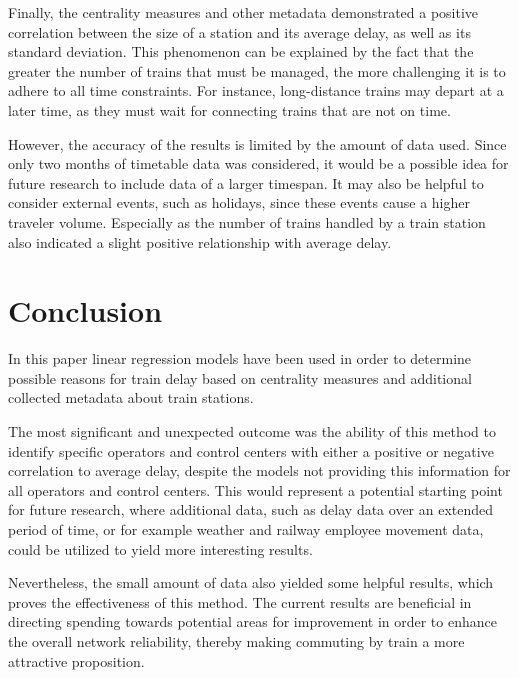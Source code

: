 \documentclass[12pt,a4paper]{article}
\begin{document}
Finally, the centrality measures and other metadata demonstrated a positive correlation between the size of a station and its average delay, as well as its standard deviation. 
This phenomenon can be explained by the fact that the greater the number of trains that must be managed, the more challenging it is to adhere to all time constraints. 
For instance, long-distance trains may depart at a later time, as they must wait for connecting trains that are not on time.

However, the accuracy of the results is limited by the amount of data used. Since only two months of timetable data was considered, it would be a possible idea for future research to include data of a larger timespan. 
It may also be helpful to consider external events, such as holidays, since these events cause a higher traveler volume. Especially as the number of trains handled by a train station also indicated a slight positive relationship with average delay.

\maketitle
\section{\label{sec:Conclusion}Conclusion}

In this paper linear regression models have been used in order to determine possible reasons for train delay based on centrality measures and additional collected metadata about train stations. 

The most significant and unexpected outcome was the ability of this method to identify specific operators and control centers with either a positive or negative correlation to average delay, despite the models not providing this information for all operators and control centers. 
This would represent a potential starting point for future research, where additional data, such as delay data over an extended period of time, or for example weather and railway employee movement data, could be utilized to yield more interesting results. 

Nevertheless, the small amount of data also yielded some helpful results, which proves the effectiveness of this method. The current results are beneficial in directing spending towards potential areas for improvement in order to enhance the overall network reliability, thereby making commuting by train a more attractive proposition.
\pagebreak
\listoftables
\listoffigures
\printbibliography
\end{document}
